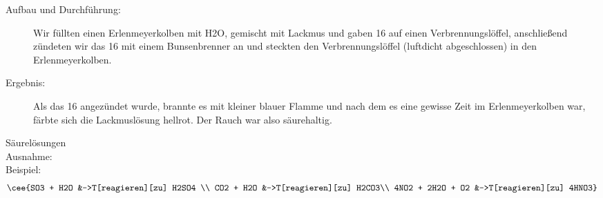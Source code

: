 \begin{description}
   \item[Aufbau und Durchführung:] Wir füllten einen Erlenmeyerkolben mit \ac{H2O}, gemischt mit Lackmus und gaben \ac{16} auf einen Verbrennungslöffel, anschließend zündeten wir das \ac{16} mit einem Bunsenbrenner an und steckten den Verbrennungslöffel (luftdicht abgeschlossen) in den Erlenmeyerkolben.
   \item[Ergebnis:] Als das \ac{16} angezündet wurde, brannte es mit kleiner blauer Flamme und nach dem es eine gewisse Zeit im Erlenmeyerkolben war, färbte sich die Lackmuslösung hellrot.
   Der Rauch war also säurehaltig.
\end{description}
Säurelösungen\\
Ausnahme:  \\

Beispiel:
\vspace{-1.14cm}
\begin{align*} \cee{SO3 + H2O &->T[reagieren][zu] H2SO4 \\
   CO2 + H2O &->T[reagieren][zu] H2CO3\\
   4NO2 + 2H2O + O2 &->T[reagieren][zu] 4HNO3}
\end{align*}



\vspace{0.4cm}


